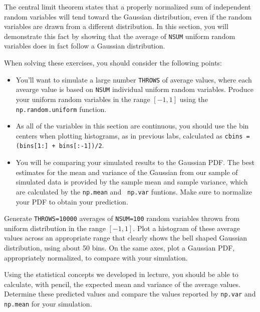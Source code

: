 The central limit theorem states that a properly normalized sum of
independent random variables will tend toward the Gaussian
distribution, even if the random variables are drawn from a different
distribution.  In this section, you will demonstrate this fact by
showing that the average of {\tt NSUM} uniform random variables does
in fact follow a Gaussian distribution.

When solving these exercises, you should consider the following points:
\begin{itemize}

\item You'll want to simulate a large number {\tt THROWS} of average
  values, where each avearge value is based on {\tt NSUM} individual
  uniform random variables.  Produce your uniform random variables in
  the range $[-1,1]$ using the {\tt np.random.uniform} function.

\item As all of the variables in this section are continuous, you should use
the bin centers when plotting histograms, as in previous labs, calculated as
{\tt cbins = (bins[1:] + bins[:-1])/2}.

\item You will be comparing your simulated results to the Gaussian
  PDF.  The best estimates for the mean and variance of the Gaussian
  from our sample of simulated data is provided by the sample mean and
  sample variance, which are calculated by the {\tt np.mean} and {\tt
    np.var} funtions.  Make sure to normalize your PDF to obtain your
  prediction.

\end{itemize}

\begin{plot} \end{plot}
Generate {\tt THROWS=10000} averages of {\tt NSUM=100} random
variables thrown from uniform distribution in the range $[-1,1]$.
Plot a histogram of these average values across an appropriate range
that clearly shows the bell shaped Gaussian distribution, using about
50 bins.  On the same axes, plot a Gaussian PDF, appropriately
normalized, to compare with your simulation.

\begin{plot} \end{plot}
Using the statistical concepts we developed in lecture, you should be
able to calculate, with pencil, the expected mean and variance of the
average values.  Determine these predicted values and compare
the values reported by {\tt np.var} and {\tt np.mean} for your
simulation.
